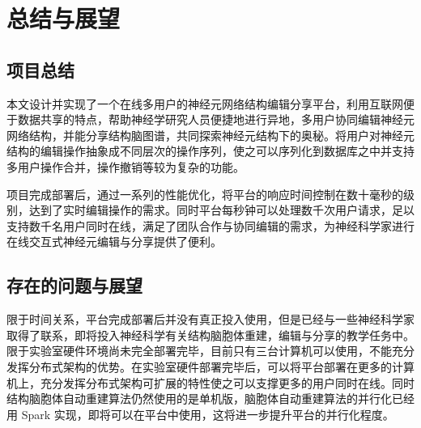 \chapter{总结与展望}

\section{项目总结}
本文设计并实现了一个在线多用户的神经元网络结构编辑分享平台，利用互联网便于数据共享的特点，帮助神经学研究人员便捷地进行异地，多用户协同编辑神经元网络结构，并能分享结构脑图谱，共同探索神经元结构下的奥秘。将用户对神经元结构的编辑操作抽象成不同层次的操作序列，使之可以序列化到数据库之中并支持多用户操作合并，操作撤销等较为复杂的功能。

项目完成部署后，通过一系列的性能优化，将平台的响应时间控制在数十毫秒的级别，达到了实时编辑操作的需求。同时平台每秒钟可以处理数千次用户请求，足以支持数千名用户同时在线，满足了团队合作与协同编辑的需求，为神经科学家进行在线交互式神经元编辑与分享提供了便利。

\section{存在的问题与展望}
限于时间关系，平台完成部署后并没有真正投入使用，但是已经与一些神经科学家取得了联系，即将投入神经科学有关结构脑胞体重建，编辑与分享的教学任务中。限于实验室硬件环境尚未完全部署完毕，目前只有三台计算机可以使用，不能充分发挥分布式架构的优势。在实验室硬件部署完毕后，可以将平台部署在更多的计算机上，充分发挥分布式架构可扩展的特性使之可以支撑更多的用户同时在线。同时结构脑胞体自动重建算法仍然使用的是单机版，脑胞体自动重建算法的并行化已经用 Spark 实现，即将可以在平台中使用，这将进一步提升平台的并行化程度。